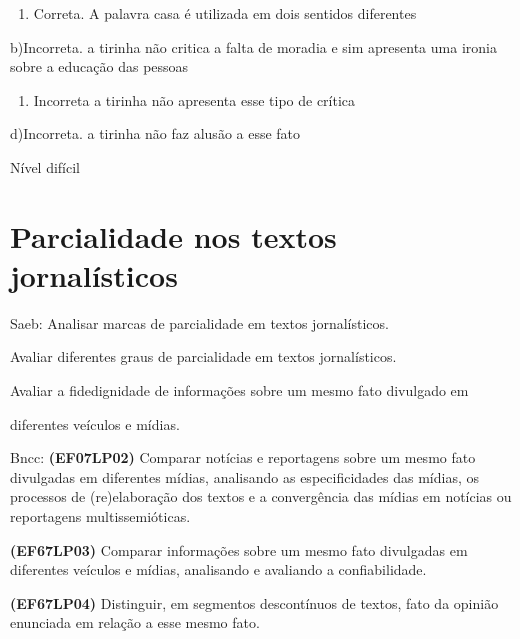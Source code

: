 {\begin{enumerate}
\def\labelenumi{\arabic{enumi}.}
\tightlist
\item
  Correta. A palavra casa é utilizada em dois sentidos diferentes
\end{enumerate}

b)Incorreta. a tirinha não critica a falta de moradia e sim apresenta
uma ironia sobre a educação das pessoas

\begin{enumerate}
\def\labelenumi{\arabic{enumi}.}
\tightlist
\item
  Incorreta a tirinha não apresenta esse tipo de crítica
\end{enumerate}

d)Incorreta. a tirinha não faz alusão a esse fato

Nível difícil

\pagestyle{port}
\chapter{Parcialidade nos textos jornalísticos}

Saeb: Analisar marcas de parcialidade em textos jornalísticos.

Avaliar diferentes graus de parcialidade em textos jornalísticos.

Avaliar a fidedignidade de informações sobre um mesmo fato divulgado em

diferentes veículos e mídias.

Bncc: \textbf{(EF07LP02)} Comparar notícias e reportagens sobre um mesmo
fato divulgadas em diferentes mídias, analisando as especificidades das
mídias, os processos de (re)elaboração dos textos e a convergência das
mídias em notícias ou reportagens multissemióticas.

\textbf{(EF67LP03)} Comparar informações sobre um mesmo fato divulgadas
em diferentes veículos e mídias, analisando e avaliando a
confiabilidade.

\textbf{(EF67LP04)} Distinguir, em segmentos descontínuos de textos,
fato da opinião enunciada em relação a esse mesmo fato.

}
